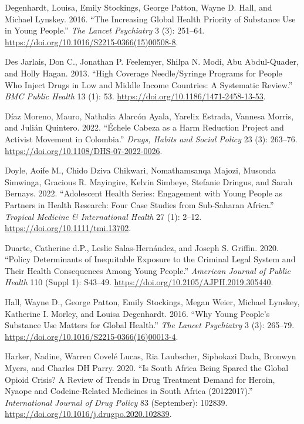 \documentclass[
  letterpaper,
  DIV=11,
  numbers=noendperiod]{scrartcl}
\newlength{\cslhangindent}
\newenvironment{CSLReferences}[2] %
 {\begin{list}{}{%
  \setlength{\itemindent}{0pt}
  \setlength{\leftmargin}{0pt}
  \setlength{\parsep}{0pt}
  \ifodd #1
   \setlength{\leftmargin}{\cslhangindent}
   \setlength{\itemindent}{-1\cslhangindent}
  \fi
  \setlength{\itemsep}{#2\baselineskip}}}
 {\end{list}}
\begin{document}
\begin{CSLReferences}{1}{0}
Degenhardt, Louisa, Emily Stockings, George Patton, Wayne D. Hall, and
Michael Lynskey. 2016. {``The Increasing Global Health Priority of
Substance Use in Young People.''} \emph{The Lancet Psychiatry} 3 (3):
251--64. \url{https://doi.org/10.1016/S2215-0366(15)00508-8}.

Des Jarlais, Don C., Jonathan P. Feelemyer, Shilpa N. Modi, Abu
Abdul-Quader, and Holly Hagan. 2013. {``High Coverage Needle/Syringe
Programs for People Who Inject Drugs in Low and Middle Income Countries:
A Systematic Review.''} \emph{BMC Public Health} 13 (1): 53.
\url{https://doi.org/10.1186/1471-2458-13-53}.

Díaz Moreno, Mauro, Nathalia Alarcón Ayala, Yarelix Estrada, Vannesa
Morris, and Julián Quintero. 2022. {``Échele Cabeza as a Harm Reduction
Project and Activist Movement in Colombia.''} \emph{Drugs, Habits and
Social Policy} 23 (3): 263--76.
\url{https://doi.org/10.1108/DHS-07-2022-0026}.

Doyle, Aoife M., Chido Dziva Chikwari, Nomathamsanqa Majozi, Musonda
Simwinga, Gracious R. Mayingire, Kelvin Simbeye, Stefanie Dringus, and
Sarah Bernays. 2022. {``Adolescent Health Series: Engagement with Young
People as Partners in Health Research: Four Case Studies from
Sub-Saharan Africa.''} \emph{Tropical Medicine \& International Health}
27 (1): 2--12. \url{https://doi.org/10.1111/tmi.13702}.

Duarte, Catherine d.P., Leslie Salas-Hernández, and Joseph S. Griffin.
2020. {``Policy Determinants of Inequitable Exposure to the Criminal
Legal System and Their Health Consequences Among Young People.''}
\emph{American Journal of Public Health} 110 (Suppl 1): S43--49.
\url{https://doi.org/10.2105/AJPH.2019.305440}.

Hall, Wayne D., George Patton, Emily Stockings, Megan Weier, Michael
Lynskey, Katherine I. Morley, and Louisa Degenhardt. 2016. {``Why Young
People's Substance Use Matters for Global Health.''} \emph{The Lancet
Psychiatry} 3 (3): 265--79.
\url{https://doi.org/10.1016/S2215-0366(16)00013-4}.

Harker, Nadine, Warren Covelé Lucas, Ria Laubscher, Siphokazi Dada,
Bronwyn Myers, and Charles DH Parry. 2020. {``Is South Africa Being
Spared the Global Opioid Crisis? A Review of Trends in Drug Treatment
Demand for Heroin, Nyaope and Codeine-Related Medicines in South Africa
(2012{\textendash}2017).''} \emph{International Journal of Drug Policy}
83 (September): 102839.
\url{https://doi.org/10.1016/j.drugpo.2020.102839}.


\end{CSLReferences}
\end{document}
